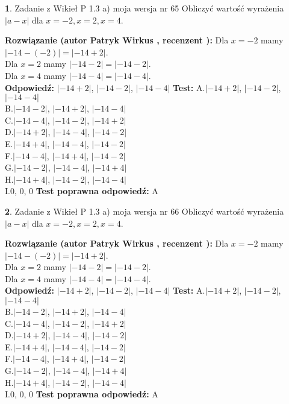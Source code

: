 \documentclass[12pt, a4paper]{article}
\theoremstyle{definition} %
\newtheorem{zad}{}
\newcommand{\zadStart}[1]{\begin{zad}#1\newline}
\newcommand{\zadStop}{\end{zad}}
\newcommand{\rozwStart}[2]{\noindent \textbf{Rozwiązanie (autor #1 , recenzent #2): }\newline}
\newcommand{\rozwStop}{\newline}
\newcommand{\odpStart}{\noindent \textbf{Odpowiedź:}\newline}
\newcommand{\odpStop}{\newline}
\newcommand{\testStart}{\noindent \textbf{Test:}\newline}
\newcommand{\testStop}{\newline}
\newcommand{\kluczStart}{\noindent \textbf{Test poprawna odpowiedź:}\newline}
\newcommand{\kluczStop}{\newline}
\begin{document}
\zadStart{Zadanie z Wikieł P 1.3 a) moja wersja nr 65}
Obliczyć wartość wyrażenia $|a - x|$ dla $x=-2,x=2,x=4$.
\zadStop
\rozwStart{Patryk Wirkus}{}
Dla $x = -2$ mamy $|-14 - (-2)| = |-14 + 2|$.\\
Dla $x = 2$ mamy $|-14 - 2| = |-14 - 2|$.\\
Dla $x = 4$ mamy $|-14 - 4| = |-14 - 4|$.\\
\rozwStop
\odpStart
$|-14 + 2|$, $|-14 - 2|$, $|-14 - 4|$
\odpStop
\testStart
A.$|-14 + 2|$, $|-14 - 2|$, $|-14 - 4|$\\
B.$|-14 - 2|$, $|-14 + 2|$, $|-14 - 4|$\\
C.$|-14 - 4|$, $|-14 - 2|$, $|-14 + 2|$\\
D.$|-14 + 2|$, $|-14 - 4|$, $|-14 - 2|$\\
E.$|-14 + 4|$, $|-14 - 4|$, $|-14 - 2|$\\
F.$|-14 - 4|$, $|-14 + 4|$, $|-14 - 2|$\\
G.$|-14 - 2|$, $|-14 - 4|$, $|-14 + 4|$\\
H.$|-14 + 4|$, $|-14 - 2|$, $|-14 - 4|$\\
I.$0$, $0$, $0$
\testStop
\kluczStart
A
\kluczStop



\zadStart{Zadanie z Wikieł P 1.3 a) moja wersja nr 66}
Obliczyć wartość wyrażenia $|a - x|$ dla $x=-2,x=2,x=4$.
\zadStop
\rozwStart{Patryk Wirkus}{}
Dla $x = -2$ mamy $|-14 - (-2)| = |-14 + 2|$.\\
Dla $x = 2$ mamy $|-14 - 2| = |-14 - 2|$.\\
Dla $x = 4$ mamy $|-14 - 4| = |-14 - 4|$.\\
\rozwStop
\odpStart
$|-14 + 2|$, $|-14 - 2|$, $|-14 - 4|$
\odpStop
\testStart
A.$|-14 + 2|$, $|-14 - 2|$, $|-14 - 4|$\\
B.$|-14 - 2|$, $|-14 + 2|$, $|-14 - 4|$\\
C.$|-14 - 4|$, $|-14 - 2|$, $|-14 + 2|$\\
D.$|-14 + 2|$, $|-14 - 4|$, $|-14 - 2|$\\
E.$|-14 + 4|$, $|-14 - 4|$, $|-14 - 2|$\\
F.$|-14 - 4|$, $|-14 + 4|$, $|-14 - 2|$\\
G.$|-14 - 2|$, $|-14 - 4|$, $|-14 + 4|$\\
H.$|-14 + 4|$, $|-14 - 2|$, $|-14 - 4|$\\
I.$0$, $0$, $0$
\testStop
\kluczStart
A
\kluczStop
\end{document}
